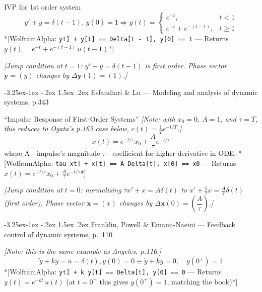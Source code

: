 \documentclass[
  11pt,
]{article}
\makeatletter
\providecommand{\implies}{\Longrightarrow}
\renewcommand\paragraph{\@startsection{paragraph}{4}{\z@}%
                                     {-3.25ex\@plus -1ex \@minus -.2ex}%
                                     {1.5ex \@plus .2ex}%
                                     {\normalfont\normalsize\bfseries}}
\makeatother
\begin{document}
IVP for 1st order system
\[ y' + y = \delta(t - 1), \, y(0) = 1 \implies  y(t)=\begin{cases}
e^{-t}, & t < 1 \\[4pt]
e^{-t} + e^{-(t-1)}, & t \ge 1
\end{cases}\] *{[}WolframAlpha:
\texttt{y\textquotesingle{}{[}t{]}\ +\ y{[}t{]}\ ==\ Delta{[}t\ -\ 1{]},\ y{[}0{]}\ ==\ 1}
--- Returns \(y(t) = e^{-t} + e^{-(t-1)} \, u(t-1)\)*{]}

\emph{{[}Jump condition at \(t=1\): \(y'+y=\delta(t-1)\) is first order.
Phase vector \(\mathbf y=(y)\) changes by
\(\Delta\mathbf y(1)=(1)\).{]}}

\hypertarget{esfandiari-lu-modeling-and-analysis-of-dynamic-systems-p.343}{%
\paragraph{Esfandiari \& Lu --- Modeling and analysis of dynamic
systems,
p.343}\label{esfandiari-lu-modeling-and-analysis-of-dynamic-systems-p.343}}

``Impulse Response of First-Order Systems'' \emph{{[}Note: with
\(x_0=0\), \(A=1\), and \(\tau=T\), this reduces to Ogata's p.163 case
below, \(c(t)=\frac{1}{T}e^{-t/T}\).{]}}
\[ x(t) = e^{-t/\tau} x_0 + \frac{A}{\tau} e^{-t/\tau} \] where A -
impulse's magnitude \(\tau\) - coefficient for higher derivative in ODE.
*{[}WolframAlpha:
\texttt{tau\ x\textquotesingle{}{[}t{]}\ +\ x{[}t{]}\ ==\ A\ Delta{[}t{]},\ x{[}0{]}\ ==\ x0}
--- Returns \(x(t) = e^{-t/\tau} x_0 + \frac{A}{\tau} e^{-t/\tau}\)*{]}

\emph{{[}Jump condition at \(t=0\): normalizing \(\tau x'+x=A\delta(t)\)
to \(x'+\tfrac1\tau x=\tfrac{A}{\tau}\delta(t)\) (first order). Phase
vector \(\mathbf x=(x)\) changes by
\(\Delta\mathbf x(0)=\left(\dfrac{A}{\tau}\right)\).{]}}

\hypertarget{franklin-powell-emami-naeini-feedback-control-of-dynamic-systems-p.-110}{%
\paragraph{Franklin, Powell \& Emami-Naeini --- Feedback control of
dynamic systems,
p.~110}\label{franklin-powell-emami-naeini-feedback-control-of-dynamic-systems-p.-110}}

\emph{{[}Note: this is the same example as Angeles, p.116.{]}} \[
\dot{y} + ky = u = \delta(t), y(0) = 0 \equiv \dot{y} + ky = 0, \quad y(0^+) = 1
\] *{[}WolframAlpha:
\texttt{y\textquotesingle{}{[}t{]}\ +\ k\ y{[}t{]}\ ==\ Delta{[}t{]},\ y{[}0{]}\ ==\ 0}
--- Returns \(y(t) = e^{-k t} \, u(t)\) (at \(t=0^+\) this gives
\(y(0^+)=1\), matching the book)*{]}
\end{document}
